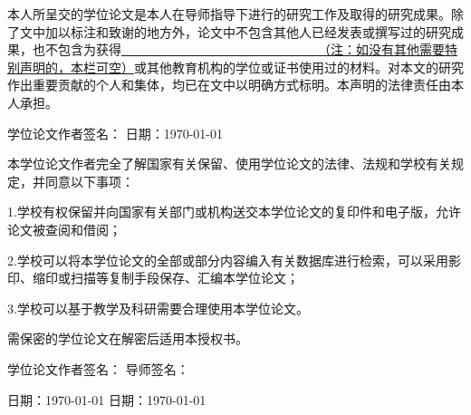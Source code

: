 \begin{titlepage}

\par\vskip30pt
\begin{spacing}{1.5}
\end{spacing}

\par\vskip20pt
本人所呈交的学位论文是本人在导师指导下进行的研究工作及取得的研究成果。除了文中加以标注和致谢的地方外，论文中不包含其他人已经发表或撰写过的研究成果，也不包含为获得\underline{~~~~~~~~~~~~~~~~~~~~~~~~~~~~~~~（注：如没有其他需要特别声明的，本栏可空）}或其他教育机构的学位或证书使用过的材料。对本文的研究作出重要贡献的个人和集体，均已在文中以明确方式标明。本声明的法律责任由本人承担。

\par\vskip60pt

学位论文作者签名：\hspace*{160pt} 日期：\today

\begin{spacing}{1.5}
\centering{- - - - - - - - - - - - - - - - - - - - - - - - - - - - - - - - - - - - - - - - - - - - - - - - - - - - - - - - - }
\end{spacing}

\begin{spacing}{1.5}
\end{spacing}

\par\vskip20pt
本学位论文作者完全了解国家有关保留、使用学位论文的法律、法规和学校有关规定，并同意以下事项：

1.学校有权保留并向国家有关部门或机构送交本学位论文的复印件和电子版，允许论文被查阅和借阅；

2.学校可以将本学位论文的全部或部分内容编入有关数据库进行检索，可以采用影印、缩印或扫描等复制手段保存、汇编本学位论文；

3.学校可以基于教学及科研需要合理使用本学位论文。

需保密的学位论文在解密后适用本授权书。

\par\vskip60pt
学位论文作者签名：\hspace*{160pt} 导师签名：
\par\vskip20pt
日期：\today \hspace*{135pt} 日期：\today

\end{titlepage}